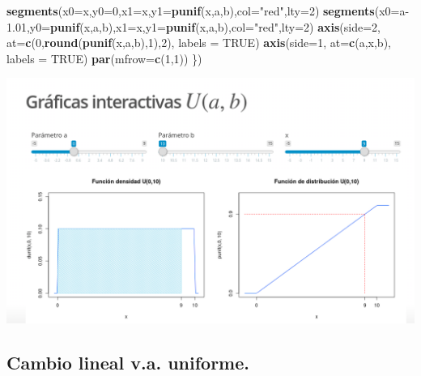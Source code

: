 \documentclass[]{book}
\newenvironment{Shaded}{\begin{snugshade}}{\end{snugshade}}
\newcommand{\DataTypeTok}[1]{\textcolor[rgb]{0.13,0.29,0.53}{#1}}
\newcommand{\DecValTok}[1]{\textcolor[rgb]{0.00,0.00,0.81}{#1}}
\newcommand{\FloatTok}[1]{\textcolor[rgb]{0.00,0.00,0.81}{#1}}
\newcommand{\KeywordTok}[1]{\textcolor[rgb]{0.13,0.29,0.53}{\textbf{#1}}}
\newcommand{\NormalTok}[1]{#1}
\newcommand{\OtherTok}[1]{\textcolor[rgb]{0.56,0.35,0.01}{#1}}
\newcommand{\StringTok}[1]{\textcolor[rgb]{0.31,0.60,0.02}{#1}}
\begin{document}
\begin{Shaded}
\begin{Highlighting}[]
  \KeywordTok{segments}\NormalTok{(}\DataTypeTok{x0=}\NormalTok{x,}\DataTypeTok{y0=}\DecValTok{0}\NormalTok{,}\DataTypeTok{x1=}\NormalTok{x,}\DataTypeTok{y1=}\KeywordTok{punif}\NormalTok{(x,a,b),}\DataTypeTok{col=}\StringTok{"red"}\NormalTok{,}\DataTypeTok{lty=}\DecValTok{2}\NormalTok{)}
  \KeywordTok{segments}\NormalTok{(}\DataTypeTok{x0=}\NormalTok{a}\FloatTok{-1.01}\NormalTok{,}\DataTypeTok{y0=}\KeywordTok{punif}\NormalTok{(x,a,b),}\DataTypeTok{x1=}\NormalTok{x,}\DataTypeTok{y1=}\KeywordTok{punif}\NormalTok{(x,a,b),}\DataTypeTok{col=}\StringTok{"red"}\NormalTok{,}\DataTypeTok{lty=}\DecValTok{2}\NormalTok{)}
  \KeywordTok{axis}\NormalTok{(}\DataTypeTok{side=}\DecValTok{2}\NormalTok{, }\DataTypeTok{at=}\KeywordTok{c}\NormalTok{(}\DecValTok{0}\NormalTok{,}\KeywordTok{round}\NormalTok{(}\KeywordTok{punif}\NormalTok{(x,a,b),}\DecValTok{1}\NormalTok{),}\DecValTok{2}\NormalTok{), }\DataTypeTok{labels =} \OtherTok{TRUE}\NormalTok{)}
  \KeywordTok{axis}\NormalTok{(}\DataTypeTok{side=}\DecValTok{1}\NormalTok{, }\DataTypeTok{at=}\KeywordTok{c}\NormalTok{(a,x,b), }\DataTypeTok{labels =} \OtherTok{TRUE}\NormalTok{)}
  \KeywordTok{par}\NormalTok{(}\DataTypeTok{mfrow=}\KeywordTok{c}\NormalTok{(}\DecValTok{1}\NormalTok{,}\DecValTok{1}\NormalTok{))}
\NormalTok{\})}
\end{Highlighting}
\end{Shaded}

\href{https://github.com/joanby/probabilidad}{\includegraphics{Images/noshinyImages/interactiva_uniforme1.png}}

\hypertarget{cambio-lineal-v.a.-uniforme.}{%
\subsection{Cambio lineal v.a. uniforme.}\label{cambio-lineal-v.a.-uniforme.}}
\end{document}
